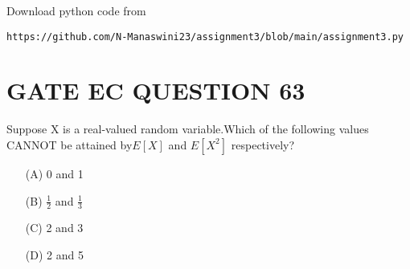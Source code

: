 \documentclass[journal,12pt,twocolumn]{IEEEtran}
\begin{document}
\renewcommand{\thefigure}{\theenumi}
\renewcommand{\thetable}{\theenumi}
Download python code from 
\begin{lstlisting}
https://github.com/N-Manaswini23/assignment3/blob/main/assignment3.py
\end{lstlisting}
%

\section*{GATE EC QUESTION 63}
Suppose X is a real-valued random variable.Which of the following values CANNOT be attained by$ E[X] $ and $ E[X^2] $ respectively?
\begin{enumerate}
\item[(A)] 0 and 1   
\item[(B)] $\frac{1}{2}$ and $\frac{1}{3}$
\item[(C)] 2 and 3
\item[(D)] 2 and 5
\end{enumerate}
\end{document}
